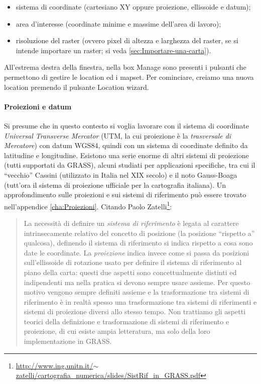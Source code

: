 		\begin{itemize}
			\item sistema di coordinate (cartesiano XY oppure proiezione, ellissoide e datum);
			\item area d'interesse (coordinate minime e massime dell'area di lavoro);
			\item risoluzione del raster (ovvero pixel di altezza e larghezza del raster, se si intende importare un raster; si veda \textsection\ref{sec:Importare-una-carta}).
		\end{itemize}
		
		All'estrema destra della finestra, nella box \textsf{Manage} sono presenti i pulsanti che permettono di gestire le location ed i mapset. Per cominciare, creiamo una nuova location premendo il pulsante \textsf{Location wizard}.


			\paragraph{Proiezioni e datum}
				Si presume che in questo contesto si voglia lavorare con il sistema di coordinate \emph{Universal Transverse Mercator} (UTM, la cui proiezione è la \emph{trasversale di Mercatore}) con datum WGS84, quindi con un sistema di coordinate definito da latitudine e longitudine. Esistono una serie enorme di altri sistemi di proiezione (tutti supportati da GRASS), alcuni studiati per applicazioni specifiche, tra cui il ``vecchio'' Cassini (utilizzato in Italia nel XIX secolo) e il noto Gauss-Boaga (tutt'ora il sistema di proiezione ufficiale per la cartografia italiana). Un approfondimento sulle proiezioni e sui sistemi di riferimento può essere trovato nell'appendice \textsection\ref{cha:Proiezioni}. Citando Paolo Zatelli\footnote{\href{http://www.ing.unitn.it/~zatelli/cartografia_numerica/slides/SistRif_in_GRASS.pdf}{http://www.ing.unitn.it/$\sim$zatelli/cartografia\_{}numerica/slides/SistRif\_{}in\_{}GRASS.pdf}}:
				
				\begin{quotation}
					La necessità di definire un \emph{sistema di riferimento} è legata al carattere intrinsecamente relativo del concetto di posizione (la posizione ``rispetto a'' qualcosa), definendo il sistema di riferimento si indica rispetto a cosa sono date le coordinate. La \emph{proiezione} indica invece come si passa da posizioni sull'ellissoide di rotazione usato per definire il sistema di riferimento al piano della carta: questi due aspetti sono concettualmente distinti ed indipendenti ma nella pratica si devono sempre usare assieme. Per questo motivo vengono sempre definiti assieme e la trasformazione tra sistemi di riferimento è in realtà spesso una trasformazione tra sistemi di riferimenti e sistemi di proiezione diversi allo stesso tempo. Non trattiamo gli aspetti teorici della definizione e trasformazione di sistemi di riferimento e proiezione, di cui esiste ampia letteratura, ma solo della loro implementazione in GRASS.
				\end{quotation}
				
